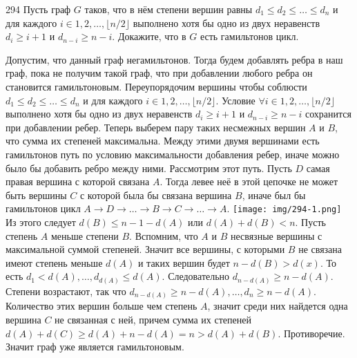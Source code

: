\begin{task}{294}
	Пусть граф $ G $ таков, что в нём степени вершин равны $ d_1 \leq d_2 \leq \ldots \leq d_n $ и для каждого $ i \in {1,2, \ldots ,⌊n/2⌋} $ выполнено хотя бы одно из двух неравенств $ d_i \geq i + 1 $ и $ d_{n−i} \geq n − i $. Докажите, что в $ G $ есть гамильтонов цикл.
\end{task}

\begin{solution} 
    Допустим, что данный граф негамильтонов. Тогда будем добавлять ребра в наш граф, пока не получим такой граф, что при добавлении любого ребра он становится гамильтоновым. Переупорядочим вершины чтобы соблюсти $ d_1 \leq d_2 \leq \ldots \leq d_n $ и для каждого $ i \in {1,2, \ldots ,⌊n/2⌋} $. Условие $\forall i \in {1,2, \ldots ,⌊n/2⌋} $ выполнено хотя бы одно из двух неравенств $ d_i \geq i + 1 $ и $ d_{n−i} \geq n − i $ сохранится при добавлении ребер. Теперь выберем пару таких несмежных вершин $A$ и $B$, что сумма их степеней максимальна. Между этими двумя вершинами есть гамильтонов путь по условию максимальности добавления ребер, иначе можно было бы добавить ребро между ними. Рассмотрим этот путь. Пусть $D$ самая правая вершина с которой связана $A$. Тогда левее неё в этой цепочке не может быть вершины $C$ с которой была бы связана вершина $B$, иначе был бы гамильтонов цикл $A \rightarrow D \rightarrow  \ldots \rightarrow B \rightarrow C \rightarrow \ldots \rightarrow A$.
    \texttt{[image: img/294-1.png]} \\
    Из этого следует $d(B) \leq n - 1 - d(A)$ или $d(A) + d(B) < n$. Пусть степень $A$ меньше степени $B$. Вспомним, что $A$ и $B$ несвязные вершины с максимальной суммой степеней. Значит все вершины, с которыми $B$ не связана имеют степень меньше $d(A)$ и таких вершин будет $n - d(B) > d(x)$. То есть $d_1 < d(A), \ldots , d_{d(A)} \leq d(A) $. Следовательно $d_{n - d(A)} \geq n - d(A)$. Степени возрастают, так что  $d_{n - d(A)} \geq n - d(A), \ldots, d_n \geq n - d(A)$. Количество этих вершин больше чем степень $A$, значит среди них найдется одна вершина $C$ не связанная с ней, причем сумма их степеней $d(A) + d(C) \geq d(A) + n - d(A) = n > d(A) + d(B)$. Противоречие. Значит граф уже является гамильтоновым.
\end{solution}